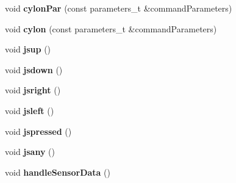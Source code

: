 \begin{DoxyCompactItemize}
\item 
void {\bfseries cylon\+Par} (const parameters\+\_\+t \&command\+Parameters)\hypertarget{class_m_q_t_tsense_h_a_t_a0c2faf77463954149558afc54f965f65}{}\label{class_m_q_t_tsense_h_a_t_a0c2faf77463954149558afc54f965f65}

\item 
void {\bfseries cylon} (const parameters\+\_\+t \&command\+Parameters)\hypertarget{class_m_q_t_tsense_h_a_t_ad70cc61332aefd376e2fafd026e51144}{}\label{class_m_q_t_tsense_h_a_t_ad70cc61332aefd376e2fafd026e51144}

\item 
void {\bfseries jsup} ()\hypertarget{class_m_q_t_tsense_h_a_t_a5d0f57ce2e94813cfa2279d17e4905ae}{}\label{class_m_q_t_tsense_h_a_t_a5d0f57ce2e94813cfa2279d17e4905ae}

\item 
void {\bfseries jsdown} ()\hypertarget{class_m_q_t_tsense_h_a_t_a49af5e2cafdc045b070601e2046ae32c}{}\label{class_m_q_t_tsense_h_a_t_a49af5e2cafdc045b070601e2046ae32c}

\item 
void {\bfseries jsright} ()\hypertarget{class_m_q_t_tsense_h_a_t_a94f4010486bd20e7f1ffd602ab4a6df8}{}\label{class_m_q_t_tsense_h_a_t_a94f4010486bd20e7f1ffd602ab4a6df8}

\item 
void {\bfseries jsleft} ()\hypertarget{class_m_q_t_tsense_h_a_t_ab02c2741dda318559e3f22b85ecd9b28}{}\label{class_m_q_t_tsense_h_a_t_ab02c2741dda318559e3f22b85ecd9b28}

\item 
void {\bfseries jspressed} ()\hypertarget{class_m_q_t_tsense_h_a_t_a4a4c34f1818a47a9e111050cdaf94157}{}\label{class_m_q_t_tsense_h_a_t_a4a4c34f1818a47a9e111050cdaf94157}

\item 
void {\bfseries jsany} ()\hypertarget{class_m_q_t_tsense_h_a_t_ae4e0f972b1ed819bad5954501b8e2597}{}\label{class_m_q_t_tsense_h_a_t_ae4e0f972b1ed819bad5954501b8e2597}

\item 
void {\bfseries handle\+Sensor\+Data} ()\hypertarget{class_m_q_t_tsense_h_a_t_a86bd30bf5003330703c0eca3d29df629}{}\label{class_m_q_t_tsense_h_a_t_a86bd30bf5003330703c0eca3d29df629}

\end{DoxyCompactItemize}
